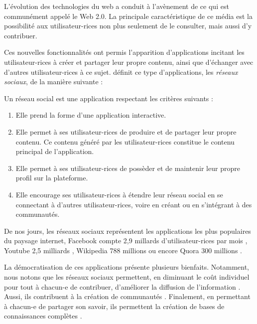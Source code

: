 L'évolution des technologies du web a conduit à l'avènement de ce qui est communément appelé le Web 2.0.
La principale caractéristique de ce média est la possibilité aux utilisateur-rices non plus seulement de le consulter, mais aussi d'y contribuer.

Ces nouvelles fonctionnalités ont permis l'apparition d'applications incitant les utilisateur-rices à créer et partager leur propre contenu, ainsi que d'échanger avec d'autres utilisateur-rices à ce sujet.
\cite{2015-social-media-definition-obar} définit ce type d'applications, \ie les \emph{réseaux sociaux}, de la manière suivante :
\begin{definition}
  Un réseau social est une application respectant les critères suivants :
  \begin{enumerate}
    \item Elle prend la forme d'une application interactive.
    \item Elle permet à ses utilisateur-rices de produire et de partager leur propre contenu.
      Ce contenu généré par les utilisateur-rices constitue le contenu principal de l'application.
    \item Elle permet à ses utilisateur-rices de possèder et de maintenir leur propre profil sur la plateforme.
    \item Elle encourage ses utilisateur-rices à étendre leur réseau social en se connectant à d'autres utilisateur-rices, voire en créant ou en s'intégrant à des communautés.
  \end{enumerate}
\end{definition}
De nos jours, les réseaux sociaux représentent les applications les plus populaires du paysage internet, \eg Facebook compte 2,9 millards d'utilisateur-rices par mois \cite{2022-01-monthly-active-users-social-networks}, Youtube 2,5 milliards \cite{2022-01-monthly-active-users-social-networks}, Wikipedia 788 millions {\cite{2022-09-monthly-active-users-wikipedia}} ou encore Quora 300 millions \cite{2022-01-monthly-active-users-social-networks}.

La démocratisation de ces applications présente plusieurs bienfaits.
Notamment, nous notons que les réseaux sociaux permettent, en diminuant le coût individuel pour tout à chacun-e de contribuer, d'améliorer la diffusion de l'information \cite{2012-youtube-social-movements-meek,2013-wealth-occupation-networks-theocharis}.
Aussi, ils contribuent à la création de communautés \cite{2013-understanding-social-media-logic-van-dijck}.
Finalement, en permettant à chacun-e de partager son savoir, ils permettent la création de bases de connaissances complètes \cite{2005-internet-encyclopaedias-head-to-head,2008-knowledge-sharing-yahoo-answers-adamic}.

